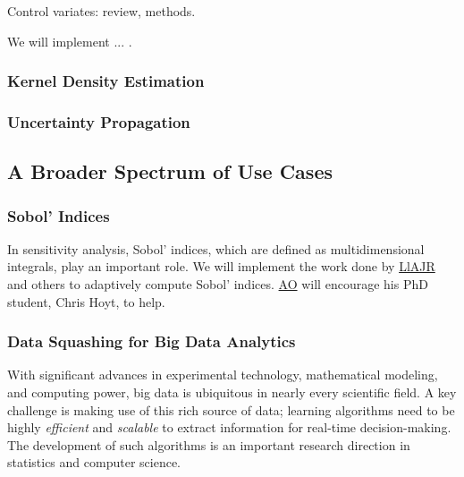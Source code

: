 \documentclass[11pt]{NSFamsart}
\newcommand{\AO}{\hyperlink{AOlink}{AO}\xspace}
\newcommand{\LlAJR}{\hyperlink{LlAJRlink}{LlAJR}\xspace}
\begin{document}
Control variates: review, methods.

We will implement ... .


\subsubsection{Kernel Density Estimation}

\subsubsection{Uncertainty Propagation}





\subsection{A Broader Spectrum of Use Cases}

\subsubsection{Sobol' Indices} In sensitivity analysis, Sobol' indices, which are defined as multidimensional integrals, play an important role.  We will implement the work done by \LlAJR and others \cite{GilEtal16a,GilJim16b} to adaptively compute Sobol' indices.  \AO will encourage his PhD student, Chris Hoyt, to help.

\subsubsection{Data Squashing for Big Data Analytics}

With significant advances in experimental technology, mathematical modeling, and computing power, big data is ubiquitous in nearly every scientific field. A key challenge is making use of this rich source of data; learning algorithms need to be highly \textit{efficient} and \textit{scalable} to extract information for real-time decision-making. The development of such algorithms is an important research direction in statistics and computer science.
\end{document}
